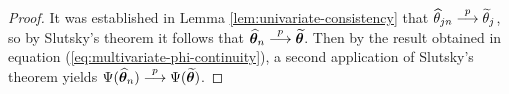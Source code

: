 \begin{proof}
  It was established in Lemma \ref{lem:univariate-consistency} that
  $\widehat{\theta}_{jn} \stackrel{p}{\longrightarrow} \widetilde{\theta}_j$, so by Slutsky's theorem
  it follows that $\widehat{\bm{\theta}}_n \stackrel{p}{\longrightarrow} \widetilde{\bm{\theta}}$.
  Then by the result obtained in equation
  (\ref{eq:multivariate-phi-continuity}), a second application of Slutsky's
  theorem yields
  $\Psi(\widehat{\bm{\theta}}_n) \stackrel{p}{\longrightarrow} \Psi(\widetilde{\bm{\theta}})$.
\end{proof}








